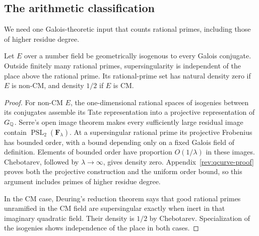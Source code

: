 \subsection{The arithmetic classification}
\label{subsec:B-Tang-application}
We need one Galois-theoretic input that counts rational primes,
including those of higher residue degree.

\begin{theorem}
\label{thm:B-qcurve-density}\label{lem:qcurve-density}
Let $E$ over a number field be geometrically isogenous to every
Galois conjugate.  Outside finitely many rational primes,
supersingularity is independent of the place above the rational
prime.  Its rational-prime set has natural density zero if $E$ is
non-CM, and density $1/2$ if $E$ is CM.
\end{theorem}
\begin{proof}
For non-CM $E$, the one-dimensional rational spaces of isogenies
between its conjugates assemble its Tate representation into a
projective representation of $G_\mathbb Q$.  Serre's open image theorem
\cite{Serre} makes every sufficiently large residual image contain
$\operatorname{PSL}_2(\mathbf F_\lambda)$.  At a supersingular
rational prime its projective Frobenius has bounded order, with a
bound depending only on a fixed Galois field of definition.
Elements of bounded order have proportion $O(1/\lambda)$ in these
images.  Chebotarev, followed by $\lambda\to\infty$, gives
density zero.  Appendix~\ref{rev:qcurve-proof} proves both the
projective construction and the uniform order bound, so this
argument includes primes of higher residue degree.

In the CM case, Deuring's reduction theorem \cite{Deuring} says
that good rational primes unramified in the CM field are
supersingular exactly when inert in that imaginary quadratic
field.  Their density is $1/2$ by Chebotarev.  Specialization of
the isogenies shows independence of the place in both cases.
\end{proof}

